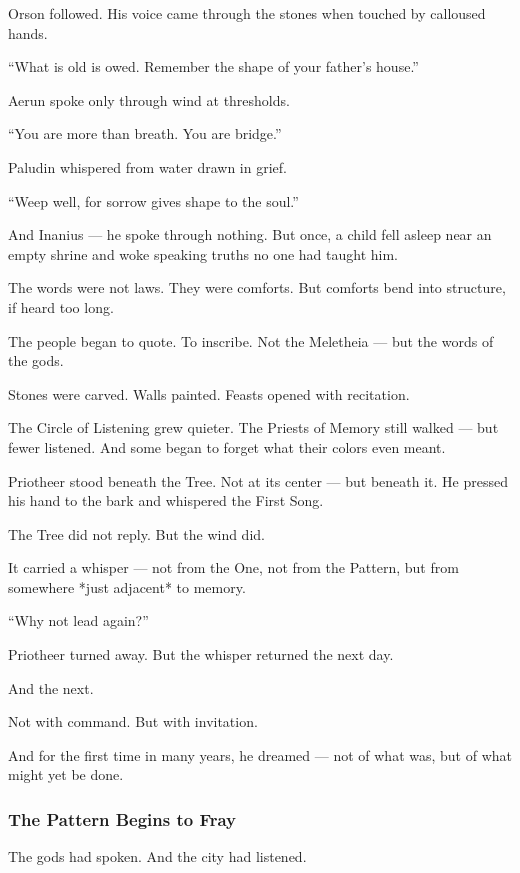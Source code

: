 \documentclass[12pt]{article}
\begin{document}
Orson followed.  
His voice came through the stones when touched by calloused hands. 

 “What is old is owed. Remember the shape of your father’s house.”

Aerun spoke only through wind at thresholds.  

 “You are more than breath. You are bridge.”

Paludin whispered from water drawn in grief.

 “Weep well, for sorrow gives shape to the soul.”

And Inanius —  
he spoke through nothing.  
But once, a child fell asleep near an empty shrine and woke speaking truths no one had taught him.

The words were not laws.  
They were comforts.  
But comforts bend into structure, if heard too long.

The people began to quote.  
To inscribe.  
Not the Meletheia — but the words of the gods.

Stones were carved.  
Walls painted.  
Feasts opened with recitation.

The Circle of Listening grew quieter.  
The Priests of Memory still walked —  
but fewer listened.  
And some began to forget what their colors even meant.

Priotheer stood beneath the Tree.  
Not at its center — but beneath it.  
He pressed his hand to the bark and whispered the First Song.

The Tree did not reply.  
But the wind did.

It carried a whisper — not from the One,  
not from the Pattern,  
but from somewhere *just adjacent* to memory.

 “Why not lead again?”

Priotheer turned away.  
But the whisper returned the next day.

And the next.

Not with command.  
But with invitation.

And for the first time in many years,  
he dreamed —  
not of what was,  
but of what might yet be done.

\dotfill

\subsubsection{The Pattern Begins to Fray}

The gods had spoken.  
And the city had listened.
\end{document}
